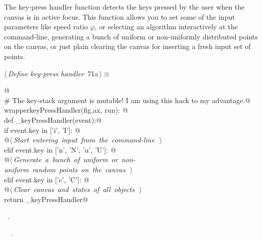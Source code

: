 \documentclass[11.5pt]{report}
\begin{document}
\vspace{-0.8cm}\newchunk The key-press handler function detects the keys pressed by the user when the canvas
is in active focus. This function allows you to set some of the input parameters like 
speed ratio $\varphi$, or selecting an algorithm interactively at the command-line, 
generating a bunch of uniform or non-uniformly distributed points on the canvas, 
or just plain clearing the canvas for inserting a fresh input set of points. 

\begin{flushleft} \small
\begin{minipage}{\linewidth}\label{scrap103}\raggedright\small
{} $\langle\,${\itshape Define key-press handler}\nobreak\ {\footnotesize {71a}}$\,\rangle\equiv$
\vspace{-1ex}
\begin{list}{}{} \item
\mbox{}\verb@   @\\
\mbox{}\verb@# The key-stack argument is mutable! I am using this hack to my advantage.@\\
\mbox{}\verb@def wrapperkeyPressHandler(fig,ax, run): @\\
\mbox{}\verb@       def _keyPressHandler(event):@\\
\mbox{}\verb@           if event.key in ['i', 'I']:  @\\
\mbox{}\verb@                @\hbox{$\langle\,${\itshape Start entering input from the command-line}\nobreak\ {\footnotesize {}}$\,\rangle$}\verb@@\\
\mbox{}\verb@           elif event.key in ['n', 'N', 'u', 'U']: @\\
\mbox{}\verb@                @\hbox{$\langle\,${\itshape Generate a bunch of uniform or non-uniform random points on the canvas}\nobreak\ {\footnotesize {}}$\,\rangle$}\verb@@\\
\mbox{}\verb@           elif event.key in ['c', 'C']: @\\
\mbox{}\verb@                @\hbox{$\langle\,${\itshape Clear canvas and states of all objects}\nobreak\ {\footnotesize {}}$\,\rangle$}\verb@@\\
\mbox{}\verb@       return _keyPressHandler@\\
\mbox{}\verb@@{\NWsep}
\end{list}
\vspace{-1.5ex}
\footnotesize
\begin{list}{}{\setlength{\itemsep}{-\parsep}\setlength{\itemindent}{-\leftmargin}}
\item \NWtxtMacroRefIn\ .
\item \NWtxtIdentsDefed\nobreak\  \verb@wrapperkeyPressHandler@\nobreak\ .
\item{}
\end{list}
\end{minipage}\vspace{4ex}
\end{flushleft}
\end{document}
